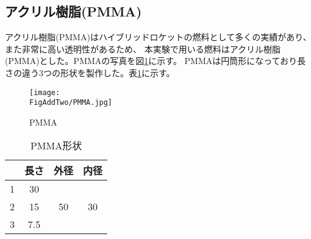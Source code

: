 \subsection{アクリル樹脂(PMMA)}
アクリル樹脂(PMMA)はハイブリッドロケットの燃料として多くの実績があり、また非常に高い透明性があるため、
本実験で用いる燃料はアクリル樹脂(PMMA)とした。PMMAの写真を図\ref{fig:PMMA}に示す。
PMMAは円筒形になっており長さの違う3つの形状を製作した。表\ref{tab:PMMA}に示す。

\begin{figure}[htbp]
\centering
\texttt{[image: \\FigAddTwo/PMMA.jpg]}
\caption{PMMA}
\label{fig:PMMA}
\end{figure}

\begin{table}[htb]
\begin{center}
\caption{PMMA形状}
\begin{tabular}{|l|c|c|c|} \hline
 & 長さ  & 外径 & 内径\\ \hline
1 & 30  &  & \\ \cline{1-2}
2 & 15  & 50 & 30\\ \cline{1-2}
3 & 7.5 &  &  \\ \hline
\end{tabular}
\label{tab:PMMA}
\end{center}
\end{table}

